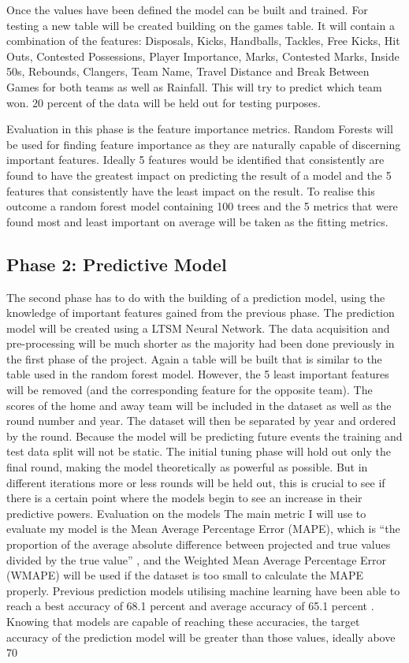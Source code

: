 \documentclass{imc-inf}
\begin{document}
	Once the values have been defined the model can be built and trained. 
	For testing a new table will be created building on the games table. It will contain a combination of the features: Disposals, Kicks, Handballs, Tackles, Free Kicks, Hit Outs, Contested Possessions, Player Importance, Marks, Contested Marks, Inside 50s, Rebounds, Clangers, Team Name, Travel Distance and Break Between Games for both teams as well as Rainfall. This will try to predict which team won. 20 percent of the data will be held out for testing purposes.
	
	Evaluation in this phase is the feature importance metrics. Random Forests will be used for finding feature importance as they are naturally capable of discerning important features. 
	Ideally 5 features would be identified that consistently are found to have the greatest impact on predicting the result of a model and the 5 features that consistently have the least impact on the result. To realise this outcome a random forest model containing 100 trees and the 5 metrics that were found most and least important on average will be taken as the fitting metrics.
	
	
	\subsection{Phase 2: Predictive Model}
	The second phase has to do with the building of a prediction model, using the knowledge of important features gained from the previous phase.
	The prediction model will be created using a LTSM Neural Network. The data acquisition and pre-processing will be much shorter as the majority had been done previously in the first phase of the project. Again a table will be built that is similar to the table used in the random forest model. However, the 5 least important features will be removed (and the corresponding feature for the opposite team). The scores of the home and away team will be included in the dataset as well as the round number and year.
	The dataset will then be separated by year and ordered by the round.
	Because the model will be predicting future events the training and test data split will not be static. The initial tuning phase will hold out only the final round, making the model theoretically as powerful as possible. But in different iterations more or less rounds will be held out, this is crucial to see if there is a certain point where the models begin to see an increase in their predictive powers.
	Evaluation on the models 
	The main metric I will use to evaluate my model is the Mean Average Percentage Error (MAPE), which is “the proportion of the average absolute difference between projected and true values divided by the true value” \cite{website:AIM}, and the Weighted Mean Average Percentage Error (WMAPE) will be used if the dataset is too small to calculate the MAPE properly. Previous prediction models utilising machine learning have been able to reach a best accuracy of 68.1 percent and average accuracy of 65.1 percent \cite{AFL_1}. Knowing that models are capable of reaching these accuracies, the target accuracy of the prediction model will be greater than those values, ideally above 70%
	
\end{document}
